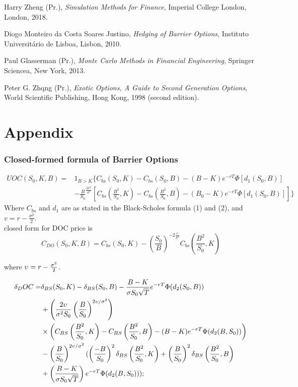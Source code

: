 \documentclass[11pt,a4paper,fleqn]{article}
\begin{document}
\begin{thebibliography}{9}

Harry Zheng (Pr.),
  \textit{Simulation Methods for Finance},
  Imperial College London, London,
  2018.

Diogo Monteiro da Costa Soares Justino,
  \textit{Hedging of Barrier Options},
  Instituto Universit\'ario de Lisboa, Lisbon,
  2010.

Paul Glasserman (Pr.),
  \textit{Monte Carlo Methods in Financial Engineering},
  Springer Sciencea, New York,
  2013.

Peter G. Zhqng (Pr.),
  \textit{Exotic Options, A Guide to Second Generation Options},
  World Scientific Publishing, Hong Kong,
  1998 (second edition).


\end{thebibliography}
\newpage

\part*{Appendix}
\appendix
\section{Closed-formed formula of Barrier Options}
\label{sec:bocomp}
\begin{equation}
\begin{aligned}
UOC(S_0,K,B) ={} &1_{B>K} \{ C_{bs}(S_0, K)-C_{bs}(S_0,B)-(B-K)e^{-rT}\Phi[d_{1}(S_0,B)] \\
      & -\frac{B}{S_0}^{\frac{2v^2}{\sigma^2}}\left[C_{bs}(\frac{B^2}{S_0}, K)-C_{bs}(\frac{B^2}{S_0}, B) -(B_0-K)e^{-rT}\Phi[d_{1}(S_0,B)]\right]\}
\end{aligned}
\end{equation}
Where $C_{bs}$ and $d_{1}$ are as stated in the Black-Scholes formula (1) and (2), and $v=r-\frac{\sigma^2}{2}$.\\

closed form for DOC price is
$$C_{DO}(S_0,K,B) = C_{bs}(S_0, K) -  (\frac{S_0}{B})^{ -2\frac{\upsilon}{\sigma^2}}C_{bs}(\frac{B^2}{S_0}, K)$$

where $\upsilon = r - {\sigma^2 \over 2}$.

\begin{align*}
\delta_DOC =& \delta_{BS}(S_0, K) - \delta_{BS}(S_0, B)-{B - K\over \sigma S_0 \sqrt{T}}e^{-rT}\Phi(d_2(S_0,B))\\
&+ \left({2\upsilon\over \sigma^2 S_0} \left({B \over S_0}\right)^{ 2\upsilon / \sigma^2} \right)\\
&\times \left(C_{BS}\left({B^2 \over S_0}, K\right) - C_{BS}\left({B^2\over S_0}, B\right) - (B - K)e^{-rT}\Phi(d_2(B, S_0))\right)\\
&-\left({B \over S_0}\right)^{ 2\upsilon / \sigma^2}(\left({-B \over S_0}\right)^2\delta_{BS}\left({B^2 \over S_0}, K\right) + \left({B\over S_0}\right)^2\delta_{BS}\left({B^2 \over S_0}, B\right)\\
&+ \left({B - K \over \sigma S_0\sqrt{T}}\right)e^{-rT}\Phi(d_2(B, S_0)));
\end{align*}
\end{document}
